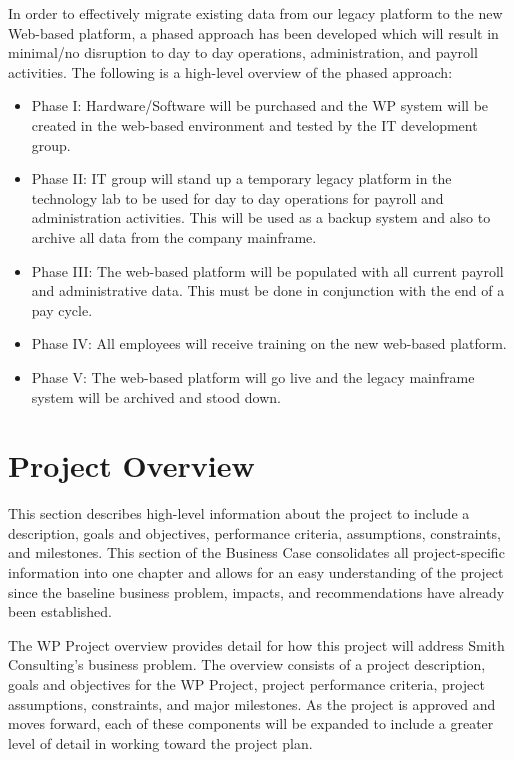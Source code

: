 \documentclass[11pt]{article}
\begin{document}
In order to effectively migrate existing data from our legacy platform to the new Web-based platform, a phased approach has been developed which will result in minimal/no disruption to day to day operations, administration, and payroll activities. The following is a high-level overview of the phased approach:

\begin{itemize}
\item Phase I: Hardware/Software will be purchased and the WP system will be created in the web-based environment and tested by the IT development group.
\item Phase II: IT group will stand up a temporary legacy platform in the technology lab to be used for day to day operations for payroll and administration activities. This will be used as a backup system and also to archive all data from the company mainframe.
\item Phase III: The web-based platform will be populated with all current payroll and administrative data. This must be done in conjunction with the end of a pay cycle.
\item Phase IV: All employees will receive training on the new web-based platform.
\item Phase V: The web-based platform will go live and the legacy mainframe system will be archived and stood down.
\end{itemize}

\section{Project Overview}
\label{sec:orgf899562}
This section describes high-level information about the project to include a description, goals and objectives, performance criteria, assumptions, constraints, and milestones. This section of the Business Case consolidates all project-specific information into one chapter and allows for an easy understanding of the project since the baseline business problem, impacts, and recommendations have already been established.

The WP Project overview provides detail for how this project will address Smith Consulting’s business problem. The overview consists of a project description, goals and objectives for the WP Project, project performance criteria, project assumptions, constraints, and major milestones. As the project is approved and moves forward, each of these components will be expanded to include a greater level of detail in working toward the project plan.
\end{document}
